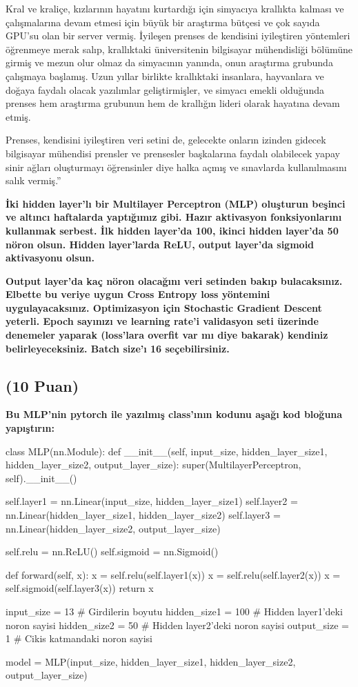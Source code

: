 \documentclass[11pt]{article}
\begin{document}
Kral ve kraliçe, kızlarının hayatını kurtardığı için simyacıya krallıkta kalması ve çalışmalarına devam etmesi için büyük bir araştırma bütçesi ve çok sayıda GPU'su olan bir server vermiş. İyileşen prenses de kendisini iyileştiren yöntemleri öğrenmeye merak salıp, krallıktaki üniversitenin bilgisayar mühendisliği bölümüne girmiş ve mezun olur olmaz da simyacının yanında, onun araştırma grubunda çalışmaya başlamış. Uzun yıllar birlikte krallıktaki insanlara, hayvanlara ve doğaya faydalı olacak yazılımlar geliştirmişler, ve simyacı emekli olduğunda prenses hem araştırma grubunun hem de krallığın lideri olarak hayatına devam etmiş.

Prenses, kendisini iyileştiren veri setini de, gelecekte onların izinden gidecek bilgisayar mühendisi prensler ve prensesler başkalarına faydalı olabilecek yapay sinir ağları oluşturmayı öğrensinler diye halka açmış ve sınavlarda kullanılmasını salık vermiş.''

\textbf{İki hidden layer'lı bir Multilayer Perceptron (MLP) oluşturun beşinci ve altıncı haftalarda yaptığımız gibi. Hazır aktivasyon fonksiyonlarını kullanmak serbest. İlk hidden layer'da 100, ikinci hidden layer'da 50 nöron olsun. Hidden layer'larda ReLU, output layer'da sigmoid aktivasyonu olsun.}

\textbf{Output layer'da kaç nöron olacağını veri setinden bakıp bulacaksınız. Elbette bu veriye uygun Cross Entropy loss yöntemini uygulayacaksınız. Optimizasyon için Stochastic Gradient Descent yeterli. Epoch sayınızı ve learning rate'i validasyon seti üzerinde denemeler yaparak (loss'lara overfit var mı diye bakarak) kendiniz belirleyeceksiniz. Batch size'ı 16 seçebilirsiniz.}

\subsection{(10 Puan)} \textbf{Bu MLP'nin pytorch ile yazılmış class'ının kodunu aşağı kod bloğuna yapıştırın:}

\begin{python}
class MLP(nn.Module):
    def __init__(self, input_size, hidden_layer_size1, hidden_layer_size2, output_layer_size):
        super(MultilayerPerceptron, self).__init__()
        
        self.layer1 = nn.Linear(input_size, hidden_layer_size1)
        self.layer2 = nn.Linear(hidden_layer_size1, hidden_layer_size2)
        self.layer3 = nn.Linear(hidden_layer_size2, output_layer_size)
        
        self.relu = nn.ReLU()
        self.sigmoid = nn.Sigmoid()

    def forward(self, x):
        x = self.relu(self.layer1(x))
        x = self.relu(self.layer2(x))
        x = self.sigmoid(self.layer3(x))
        return x
        
input_size = 13     # Girdilerin boyutu
hidden_size1 = 100  # Hidden layer1'deki noron sayisi
hidden_size2 = 50   # Hidden layer2'deki noron sayisi
output_size = 1     # Cikis katmandaki noron sayisi

model = MLP(input_size, hidden_layer_size1, hidden_layer_size2, output_layer_size)
\end{python}
\end{document}
